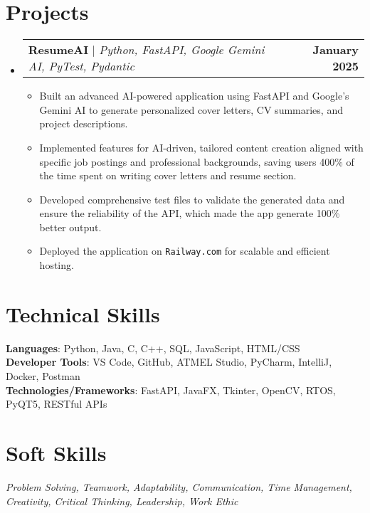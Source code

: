 \documentclass[letterpaper,11pt]{article}
\makeatletter
\newcommand{\resumeItem}[1]{
  \item\small{
    {#1 \vspace{-2pt}}
  }
}
\newcommand{\resumeProjectHeading}[2]{
    \item
    \begin{tabular*}{1.001\textwidth}{l@{\extracolsep{\fill}}r}
      \small#1 & \textbf{\small #2}\\
    \end{tabular*}\vspace{-7pt}
}
\newcommand{\resumeSubHeadingListStart}{\begin{itemize}[leftmargin=0.0in, label={}]}
\newcommand{\resumeSubHeadingListEnd}{\end{itemize}}
\newcommand{\resumeItemListStart}{\begin{itemize}}
\newcommand{\resumeItemListEnd}{\end{itemize}\vspace{-5pt}}
\newcommand{\projectsPlaceholder}[1]{#1}
\newcommand{\techSkillsPlaceholder}[1]{#1}
\newcommand{\softSkillsPlaceholder}[1]{#1}
\makeatother
\begin{document}
\section{Projects}
\vspace{-5pt}
\resumeSubHeadingListStart

\projectsPlaceholder{

  \resumeProjectHeading
    {\textbf{ResumeAI} $|$ \emph{Python, FastAPI, Google Gemini AI, PyTest, Pydantic}}{January 2025}
    \resumeItemListStart
    \resumeItem{Built an advanced AI-powered application using FastAPI and Google's Gemini AI to generate personalized cover letters, CV summaries, and project descriptions.}
    \resumeItem{Implemented features for AI-driven, tailored content creation aligned with specific job postings and professional backgrounds, saving users 400\% of the time spent on writing cover letters and resume section.}
    \resumeItem{Developed comprehensive test files to validate the generated data and ensure the reliability of the API,
    which made the app generate 100\% better output.}
    \resumeItem{Deployed the application on \texttt{Railway.com} for scalable and efficient hosting.}

  \resumeItemListEnd
  \vspace{-13pt}
  }
\resumeSubHeadingListEnd

\vspace{-2pt}
\section{Technical Skills}
 \begin{itemize}[leftmargin=0.15in, label={}]

    \small{\item{
    \techSkillsPlaceholder{
     \textbf{Languages}{: Python, Java, C, C++, SQL, JavaScript, HTML/CSS} \\
     \textbf{Developer Tools}{: VS Code, GitHub, ATMEL Studio, PyCharm, IntelliJ, Docker, Postman} \\
     \textbf{Technologies/Frameworks}{: FastAPI, JavaFX, Tkinter, OpenCV, RTOS, PyQT5, RESTful APIs} \\
    }
    }
    }
 \end{itemize}
 \vspace{-16pt}

 \section{Soft Skills}    
    \begin{itemize}[leftmargin=0.15in, label={}]
      \small{\item{
      \softSkillsPlaceholder{
        \emph{Problem Solving, Teamwork, Adaptability, Communication, Time Management, Creativity, Critical Thinking, Leadership, Work Ethic}
      }
        }}
    \end{itemize}
    \vspace{-10pt}
\end{document}
